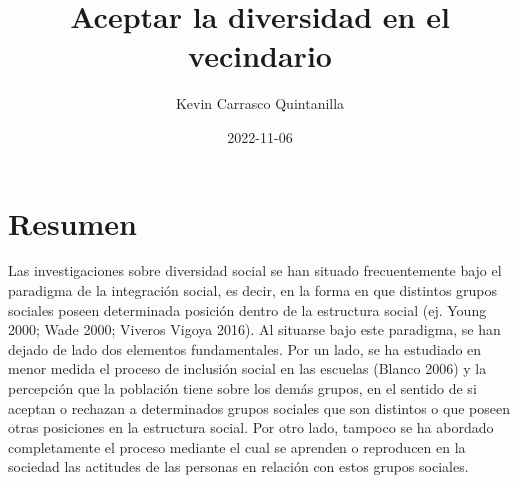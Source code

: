 \documentclass[12pt,twoside]{templates/facsothesis}
\title{Aceptar la diversidad en el vecindario}
\author{Kevin Carrasco Quintanilla}
\date{2022-11-06}
\begin{document}

  \maketitle

\frontmatter %
\pagestyle{empty} %



  \setcounter{tocdepth}{1}
  \setlength{\parskip}{0pt}
  \tableofcontents

\setlength\parskip{1em plus 0.1em minus 0.2em}

  \listoftables

  \listoffigures



\mainmatter %
\pagestyle{fancyplain} %

\hypertarget{resumen}{%
\chapter{Resumen}\label{resumen}}

Las investigaciones sobre diversidad social se han situado frecuentemente bajo el paradigma de la integración social, es decir, en la forma en que distintos grupos sociales poseen determinada posición dentro de la estructura social (ej. Young 2000; Wade 2000; Viveros Vigoya 2016). Al situarse bajo este paradigma, se han dejado de lado dos elementos fundamentales. Por un lado, se ha estudiado en menor medida el proceso de inclusión social en las escuelas (Blanco 2006) y la percepción que la población tiene sobre los demás grupos, en el sentido de si aceptan o rechazan a determinados grupos sociales que son distintos o que poseen otras posiciones en la estructura social. Por otro lado, tampoco se ha abordado completamente el proceso mediante el cual se aprenden o reproducen en la sociedad las actitudes de las personas en relación con estos grupos sociales.
\end{document}
